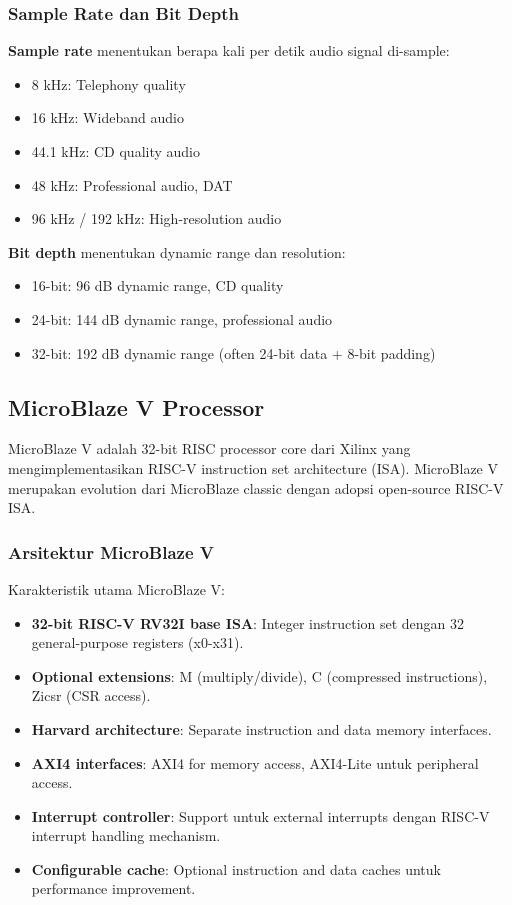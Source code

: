\subsubsection{Sample Rate dan Bit Depth}

\textbf{Sample rate} menentukan berapa kali per detik audio signal di-sample:
\begin{itemize}
	\item 8 kHz: Telephony quality
	\item 16 kHz: Wideband audio
	\item 44.1 kHz: CD quality audio
	\item 48 kHz: Professional audio, DAT
	\item 96 kHz / 192 kHz: High-resolution audio
\end{itemize}

\textbf{Bit depth} menentukan dynamic range dan resolution:
\begin{itemize}
	\item 16-bit: 96 dB dynamic range, CD quality
	\item 24-bit: 144 dB dynamic range, professional audio
	\item 32-bit: 192 dB dynamic range (often 24-bit data + 8-bit padding)
\end{itemize}

\subsection{MicroBlaze V Processor}

MicroBlaze V adalah 32-bit RISC processor core dari Xilinx yang mengimplementasikan RISC-V instruction set architecture (ISA). MicroBlaze V merupakan evolution dari MicroBlaze classic dengan adopsi open-source RISC-V ISA.

\subsubsection{Arsitektur MicroBlaze V}

Karakteristik utama MicroBlaze V:
\begin{itemize}
	\item \textbf{32-bit RISC-V RV32I base ISA}: Integer instruction set dengan 32 general-purpose registers (x0-x31).
	\item \textbf{Optional extensions}: M (multiply/divide), C (compressed instructions), Zicsr (CSR access).
	\item \textbf{Harvard architecture}: Separate instruction and data memory interfaces.
	\item \textbf{AXI4 interfaces}: AXI4 for memory access, AXI4-Lite untuk peripheral access.
	\item \textbf{Interrupt controller}: Support untuk external interrupts dengan RISC-V interrupt handling mechanism.
	\item \textbf{Configurable cache}: Optional instruction and data caches untuk performance improvement.
\end{itemize}

